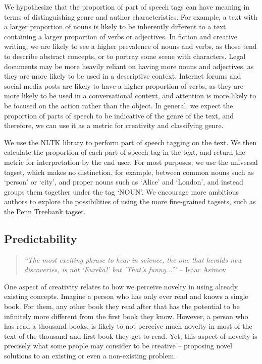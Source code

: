 We hypothesize that the proportion of part of speech tags can have meaning in terms of distinguishing genre and author characteristics. For example, a text with a larger proportion of nouns is likely to be inherently different to a text containing a larger proportion of verbs or adjectives. In fiction and creative writing, we are likely to see a higher prevalence of nouns and verbs, as those tend to describe abstract concepts, or to portray some scene with characters. Legal documents may be more heavily reliant on having more nouns and adjectives, as they are more likely to be used in a descriptive context. Internet forums and social media posts are likely to have a higher proportion of verbs, as they are more likely to be used in a conversational context, and attention is more likely to be focused on the action rather than the object. In general, we expect the proportion of parts of speech to be indicative of the genre of the text, and therefore, we can use it as a metric for creativity and classifying genre.

We use the NLTK library \citep{nltk_citation} to perform part of speech tagging on the text. We then calculate the proportion of each part of speech tag in the text, and return the metric for interpretation by the end user. For most purposes, we use the universal tagset, which makes no distinction, for example, between common nouns such as `person' or `city', and proper nouns such as `Alice' and `London', and instead groups them together under the tag `NOUN'. We encourage more ambitious authors to explore the possibilities of using the more fine-grained tagsets, such as the Penn Treebank tagset.

\subsection{Predictability}\label{predictability}\label{heavyweight_metrics}

\begin{quote}
\textit{    “The most exciting phrase to hear in science, the one that heralds new discoveries, is not `Eureka!' but `That's funny...'}” -- Isaac Asimov
\end{quote}


One aspect of creativity relates to how we perceive novelty in using already existing concepts. Imagine a person who has only ever read and knows a single book. For them, any other book they read after that has the potential to be infinitely more different from the first book they know. However, a person who has read a thousand books, is likely to not perceive much novelty in most of the text of the thousand and first book they get to read. Yet, this aspect of novelty is precisely what some people may consider to be creative -- proposing novel solutions to an existing or even a non-existing problem.


